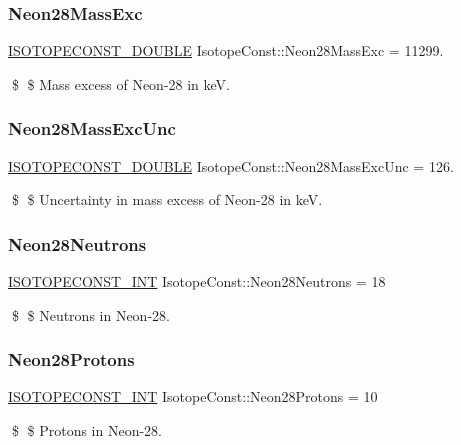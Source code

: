 \subsubsection{\texorpdfstring{Neon28\+Mass\+Exc}{Neon28MassExc}}
{\footnotesize\ttfamily \mbox{\hyperlink{group___isotope_const-_macros_ga8f45a7272ce02c0b4c65c44636ed719a}{I\+S\+O\+T\+O\+P\+E\+C\+O\+N\+S\+T\+\_\+\+D\+O\+U\+B\+LE}} Isotope\+Const\+::\+Neon28\+Mass\+Exc = 11299.}

\$ \$ Mass excess of Neon-\/28 in keV. \mbox{\label{group___isotope_const-_neon-_ne28_gae65736ca059f96155c298f38d6f43c48}} 
\subsubsection{\texorpdfstring{Neon28\+Mass\+Exc\+Unc}{Neon28MassExcUnc}}
{\footnotesize\ttfamily \mbox{\hyperlink{group___isotope_const-_macros_ga8f45a7272ce02c0b4c65c44636ed719a}{I\+S\+O\+T\+O\+P\+E\+C\+O\+N\+S\+T\+\_\+\+D\+O\+U\+B\+LE}} Isotope\+Const\+::\+Neon28\+Mass\+Exc\+Unc = 126.}

\$ \$ Uncertainty in mass excess of Neon-\/28 in keV. \mbox{\label{group___isotope_const-_neon-_ne28_ga9d9d50c33b4aada6b3842041a8db440f}} 
\subsubsection{\texorpdfstring{Neon28\+Neutrons}{Neon28Neutrons}}
{\footnotesize\ttfamily \mbox{\hyperlink{group___isotope_const-_macros_ga5f18360b3e99483a35c32d789e62621c}{I\+S\+O\+T\+O\+P\+E\+C\+O\+N\+S\+T\+\_\+\+I\+NT}} Isotope\+Const\+::\+Neon28\+Neutrons = 18}

\$ \$ Neutrons in Neon-\/28. \mbox{\label{group___isotope_const-_neon-_ne28_gad228b1fc55dd5954989e33fa5eea5e34}} 
\subsubsection{\texorpdfstring{Neon28\+Protons}{Neon28Protons}}
{\footnotesize\ttfamily \mbox{\hyperlink{group___isotope_const-_macros_ga5f18360b3e99483a35c32d789e62621c}{I\+S\+O\+T\+O\+P\+E\+C\+O\+N\+S\+T\+\_\+\+I\+NT}} Isotope\+Const\+::\+Neon28\+Protons = 10}

\$ \$ Protons in Neon-\/28. 
